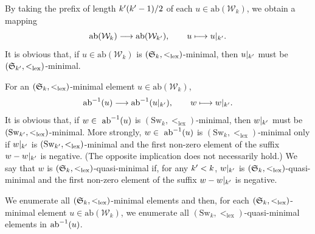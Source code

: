 \documentclass{amsart} %
\newcommand{\Sw}{\mathrm{Sw}}
\newcommand{\Wk}{\mathcal{W}_k}
\newcommand{\abs}[1]{\mathrm{ab}(#1)}
\newcommand{\ab}{\mathrm{ab}}
\newcommand{\lex}{\mathrm{lex}}
\begin{document}
By taking the prefix of length $k^{\prime}(k^{\prime}-1)/2$ of each $u \in \abs{\Wk}$,
we obtain a mapping
\[
\abs{\Wk} \longrightarrow \abs{\WWW_{k\sprime}},
\qquad
u \longmapsto u|_{k\sprime}.
\]
It is obvious that, if $u\in \abs{\Wk}$ is $(\SSSS_k, <_{\lex})$-minimal,
then $u|_{k^{\prime}}$ must be  $(\SSSS_{k\sprime}, <_{\lex})$-minimal.
 \par
 For an $(\SSSS_k, <_{\lex})$-minimal element $u\in \abs{\Wk}$, 
 \[
 \ab\inv (u)  \longrightarrow \ab\inv(u|_{k\sprime}),
 \qquad
w \longmapsto w|_{k\sprime}.
 \]
 It is obvious that, if $w\in \ \ab\inv (u)$ is $(\Sw_k, <_{\lex})$-minimal,
then $w|_{k^{\prime}}$ must be  $(\Sw_{k\sprime}, <_{\lex})$-minimal.
More strongly, 
$w\in \ \ab\inv (u)$ is $(\Sw_k, <_{\lex})$-minimal
only if 
$w|_{k^{\prime}}$ is $(\Sw_{k\sprime}, <_{\lex})$-minimal
and the first non-zero element of the suffix $w-w|_{k^{\prime}}$ is negative.
(The opposite implication does not necessarily hold.)
We say that $w$ is $(\SSSS_k, <_{\lex})$-quasi-minimal 
if, for any $k^{\prime}<k$,
 $w|_{k^{\prime}}$ is  $(\SSSS_k, <_{\lex})$-quasi-minimal 
and the first non-zero element of the suffix $w-w|_{k^{\prime}}$ is negative.
\par
We enumerate all  $(\SSSS_k, <_{\lex})$-minimal elements 
and then, for each  $(\SSSS_k, <_{\lex})$-minimal element $u\in \abs{\Wk}$,
we enumerate all  $(\Sw_k, <_{\lex})$-quasi-minimal  elements in $\ab\inv (u)$.
%
%
\end{document}
